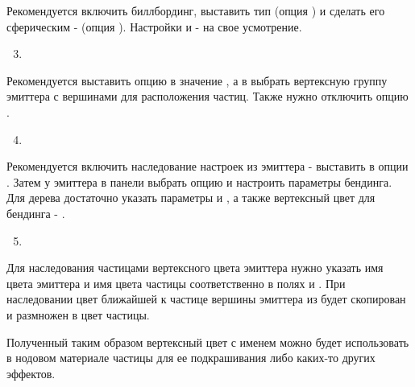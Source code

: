 \documentclass[a4paper,12pt,oneside]{sphinxmanual}
\begin{document}
Рекомендуется включить биллбординг, выставить тип  (опция ) и сделать его сферическим -  (опция ). Настройки  и  - на свое усмотрение.
\begin{enumerate}
\setcounter{enumi}{2}
\item {} 

\end{enumerate}

Рекомендуется выставить опцию  в значение , а в  выбрать вертексную группу эмиттера с вершинами для расположения частиц. Также нужно отключить опцию .
\begin{enumerate}
\setcounter{enumi}{3}
\item {} 

\end{enumerate}

Рекомендуется включить наследование настроек из эмиттера - выставить  в опции . Затем у эмиттера в панели  выбрать опцию  и настроить параметры бендинга. Для дерева достаточно указать параметры  и , а также вертексный цвет для бендинга - .
\begin{enumerate}
\setcounter{enumi}{4}
\item {} 

\end{enumerate}

Для наследования частицами вертексного цвета эмиттера нужно указать имя цвета эмиттера и имя цвета частицы соответственно в полях  и . При наследовании цвет ближайшей к частице вершины эмиттера из  будет скопирован и размножен в цвет  частицы.

Полученный таким образом вертексный цвет с именем  можно будет использовать в нодовом материале частицы для ее подкрашивания либо каких-то других эффектов.
\end{document}
